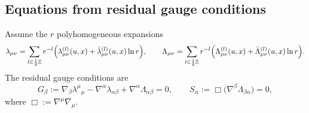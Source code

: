 \documentclass[a4paper,12pt]{article}
\begin{document}
\subsection{Equations from residual gauge conditions}\label{B1}

%
%
%
%


Assume the $r$ polyhomogeneous expansions
\begin{equation}
\lambda_{\mu\nu}
=\sum_{l\in\frac12\mathbb Z} r^{-l}\Bigl(\lambda_{\mu\nu}^{(l)}(u,x)
+\bar\lambda_{\mu\nu}^{(l)}(u,x)\ln r\Bigr),
\qquad
\Lambda_{\mu\nu}
=\sum_{l\in\frac12\mathbb Z} r^{-l}\Bigl(\Lambda_{\mu\nu}^{(l)}(u,x)
+\bar\Lambda_{\mu\nu}^{(l)}(u,x)\ln r\Bigr).
\label{exp_lam_Lam_covD}
\end{equation}
The residual gauge conditions are
\begin{equation}
G_{\beta}:=\nabla_{\beta}\lambda^{\mu}{}_{\mu}
-\nabla^{\alpha}\lambda_{\alpha\beta}
+\nabla^{\alpha}\Lambda_{\alpha\beta}=0,
\qquad
S_{\alpha}:=\Box\bigl(\nabla^{\beta}\Lambda_{\beta\alpha}\bigr)=0,
\label{resgauge_covD}
\end{equation}
where $\Box:=\nabla^\mu\nabla_\mu$.
\end{document}
